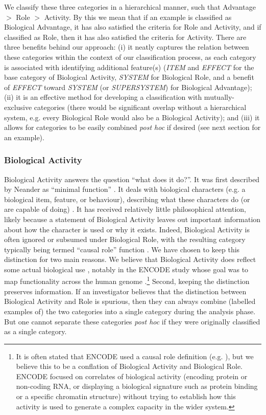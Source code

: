 \documentclass{article}
\begin{document}
We classify these three categories in a hierarchical manner, such that Advantage $>$ Role $>$ Activity.
By this we mean that if an example is classified as Biological Advantage, it has also satisfied the criteria for Role and Activity, and if classified as Role, then it has also satisfied the criteria for Activity.
There are three benefits behind our approach: (i) it neatly captures the relation between these categories within the context of our classification process, as each category is associated with identifying additional feature(s) (\emph{ITEM} and \emph{EFFECT} for the base category of Biological Activity, \emph{SYSTEM} for Biological Role, and a benefit of \emph{EFFECT} toward \emph{SYSTEM} (or \emph{SUPERSYSTEM}) for Biological Advantage); (ii) it is an effective method for developing a classification with mutually-exclusive categories (there would be significant overlap without a hierarchical system, e.g. every Biological Role would also be a Biological Activity); and (iii) it allows for categories to be easily combined \emph{post hoc} if desired (see next section for an example).

\subsubsection{Biological Activity}
\label{sec:biological-activity-1}

Biological Activity answers the question ``what does it do?''.
It was first described by Neander as ``minimal function'' \cite{neander1995} .
It deals with biological characters (e.g. a biological item, feature, or behaviour), describing what these characters do (or are capable of doing) \cite{wouters2003} .
It has received relatively little philosophical attention, likely because a statement of Biological Activity leaves out important information about how the character is used or why it exists.
Indeed, Biological Activity is often ignored or subsumed under Biological Role, with the resulting category typically being termed ``causal role'' function \cite{cummins1975} .
We have chosen to keep this distinction for two main reasons.
We believe that Biological Activity does reflect some actual biological use \cite{wouters2003}, notably in the ENCODE study whose goal was to map functionality across the human genome \cite{encode2012}.\footnote{It is often stated that ENCODE used a causal role definition (e.g. \cite{graur2013}), but we believe this to be a conflation of Biological Activity and Biological Role. ENCODE focused on correlates of biological activity (encoding protein or non-coding RNA, or displaying a biological signature such as protein binding or a specific chromatin structure) without trying to establish how this activity is used to generate a complex capacity in the wider system.}
Second, keeping the distinction preserves information.
If an investigator believes that the distinction between Biological Activity and Role is spurious, then they can always combine (labelled examples of) the two categories into a single category during the analysis phase.
But one cannot separate these categories \emph{post hoc} if they were originally classified as a single category.
\end{document}
